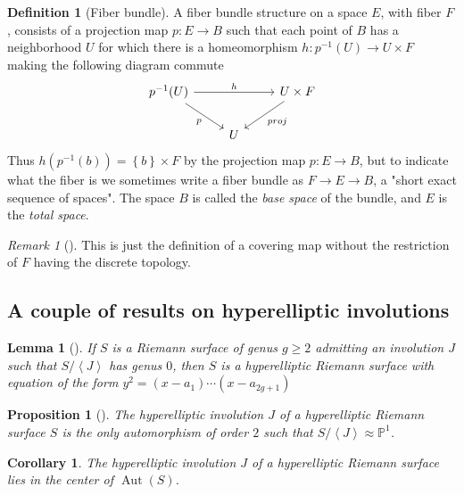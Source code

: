 \documentclass[reqno]{amsart}
\newtheorem{lemma}[theorem]{Lemma}
\newtheorem{proposition}[theorem]{Proposition}
\newtheorem{corollary}[theorem]{Corollary}
\theoremstyle{definition}
\newtheorem{definition}[theorem]{Definition}
\theoremstyle{remark}
\newtheorem*{remark}{Remark}
\DeclareMathOperator{\Aut}{Aut}
\begin{document}
\begin{definition}[Fiber bundle]
    A fiber bundle structure on a space $E$, with fiber
    $F$, consists of a projection map
    $p \colon E \to B$ such that each point of $B$ has
    a neighborhood $U$ for which there is a homeomorphism
    $h \colon p^{-1}(U) \to U \times F$ making
    the following diagram commute
    \begin{equation*}
    \begin{tikzcd}
        p^{-1}(U) \ar[rr, "h"] \ar[dr, "p"'] & & U \times F
        \ar[dl, "proj"] \\
                                            & U&
    \end{tikzcd}
    \end{equation*}
    Thus
    $h \left( p^{-1}(b) \right) 
    = \left\{ b \right\} \times F$ by the projection map 
    $p \colon E \to B$, but to indicate what the fiber
    is we sometimes write a fiber bundle as
    $F \to E \to B$, a "short exact sequence of spaces".
    The space $B$ is called the \textit{base space} of the
    bundle, and $E$ is the \textit{total space}.
\end{definition}          

\begin{remark}[]
    This is just the definition of a covering map
    without the restriction of $F$ having the discrete
    topology.
\end{remark}
          
\subsection{A couple of results on hyperelliptic involutions}

\begin{lemma}[]
    If $S$ is a Riemann surface of genus $g \ge 2$ admitting
    an involution $J$ such that
    $S / \left<J \right>$ has genus $0$, then
    $S$ is a hyperelliptic Riemann surface with
    equation of the form
    $y^2 = \left( x-a_1 \right) \cdots
    \left( x- a_{2g+1} \right) $
\end{lemma}

\begin{proposition}[]
    The hyperelliptic involution
    $J$ of a hyperelliptic Riemann surface $S$ is
    the only automorphism of order $2$ such that
    $S / \left<J \right> \approx \mathbb{P}^{1}$.
\end{proposition}

\begin{corollary}\label{hyperelliptic-involution-in-center}
    The hyperelliptic involution $J$ of a hyperelliptic
    Riemann surface lies in the center of
    $\Aut (S)$.
\end{corollary}


          




\newpage

\printbibliography
\end{document}
